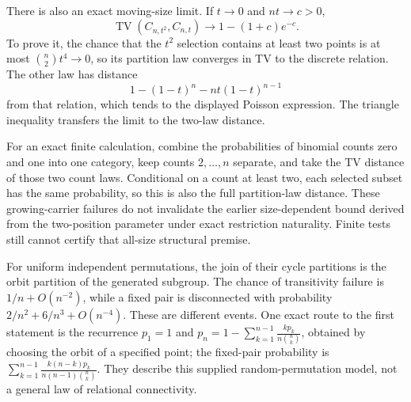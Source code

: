 There is also an exact moving-size limit.  If \(t\to0\) and \(nt\to c>0\),
\[
 \operatorname{TV}(C_{n,t^2},C_{n,t})
       \longrightarrow 1-(1+c)e^{-c}.
\]
To prove it, the chance that the \(t^2\) selection contains at least
two points is at most \(\binom n2t^4\to0\), so its partition law
converges in TV to the discrete relation.  The other law has distance
\[
 1-(1-t)^n-nt(1-t)^{n-1}
\]
from that relation, which tends to the displayed Poisson expression.
The triangle inequality transfers the limit to the two-law distance.

For an exact finite calculation, combine the probabilities of binomial
counts zero and one into one category, keep counts \(2,\ldots,n\)
separate, and take the TV distance of those two count laws.  Conditional
on a count at least two, each selected subset has the same probability,
so this is also the full partition-law distance.
These growing-carrier failures do not invalidate the earlier
size-dependent bound derived from the two-position parameter under
exact restriction naturality.  Finite tests still cannot certify that
all-size structural premise.

For uniform independent permutations, the join of their cycle partitions is the orbit partition of the generated subgroup. The chance of transitivity failure is $1/n+O(n^{-2})$, while a fixed pair is disconnected with probability $2/n^2+6/n^3+O(n^{-4})$. These are different events. One exact route to the first statement is the recurrence $p_1=1$ and
$p_n=1-\sum_{k=1}^{n-1}\frac{k p_k}{n\binom nk}$,
obtained by choosing the orbit of a specified point; the fixed-pair probability is
$\sum_{k=1}^{n-1}\frac{k(n-k)p_k}{n(n-1)\binom nk}$.
They describe this supplied random-permutation model, not a general law of relational connectivity.

